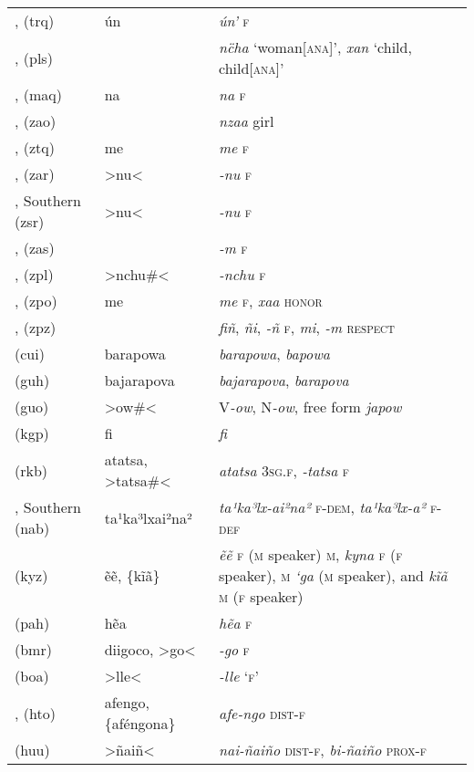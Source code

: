 {\begin{longtable}{L{.25\textwidth}L{.25\textwidth}L{.5\textwidth}}
,  (trq)	&	ún\textquotesingle{}	&	\textit{ún’} \textsc{f}	\\
,  (pls)	&		&	\textit{nc̈ha} ‘woman[\textsc{ana}]’, \textit{xan} ‘child, child[\textsc{ana}]’	\\
,  (maq)	&	na	&	\textit{na} \textsc{f}	\\
,  (zao)	&		&	\textit{nzaa} girl	\\
,  (ztq)	&	me	&	\textit{me} \textsc{f}	\\
,  (zar)	&	>nu<	&	\textit{-nu} \textsc{f}	\\
, Southern  (zsr) 	&	>nu<	&	\textit{-nu} \textsc{f}	\\
,  (zas)	&		&	\textit{-m} \textsc{f}	\\
,  (zpl)	&	>nchu\#<	&	\textit{-nchu} \textsc{f}	\\
,  (zpo)	&	me	&	\textit{me} \textsc{f}, \textit{xaa} \textsc{honor}	\\
,  (zpz)	&		&	\textit{fiñ}, \textit{ñi}, \textit{-ñ} \textsc{f}, \textit{mi}, \textit{-m} \textsc{respect}	\\
 (cui)	&	barapowa	&	\textit{barapowa}, \textit{bapowa}	\\
 (guh)	&	bajarapova	&	\textit{bajarapova}, \textit{barapova}	\\
 (guo)	&	>ow\#<	&	V\textit{-ow}, N\textit{-ow}, free form \textit{japow}	\\
 (kgp)	&	fi	&	\textit{fi}	\\
 (rkb)	&	atatsa, >tatsa\#<	&	\textit{atatsa} \textsc{3sg.f}, \textit{-tatsa} \textsc{f}	\\
, Southern (nab)	&	ta¹ka³lxai²na²	&	\textit{ta¹ka³lx-ai²na²} \textsc{f-dem}, \textit{ta¹ka³lx-a²} \textsc{f-def}	\\
 (kyz)	&	ẽẽ, \{kĩã\}	&	\textit{ẽẽ} \textsc{f} (\textsc{m} speaker) \textsc{m}, \textit{kyna} \textsc{f} (\textsc{f} speaker), \textsc{m} \textit{‘ga} (\textsc{m} speaker), and \textit{kĩã} \textsc{m} (\textsc{f} speaker)	\\
 (pah)	&	hẽa	&	\textit{hẽa} \textsc{f}	\\
 (bmr)	&	diigoco, >go<	&	\textit{-go} \textsc{f}	\\
 (boa)	&	>lle<	&	\textit{-lle} ‘\textsc{f}’	\\
,  (hto)	&	afengo, \{aféngona\}	&	\textit{afe-ngo} \textsc{dist-f}	\\
  (huu)	&	>ñaiñ<	&	\textit{nai-ñaiño} \textsc{dist-f}, \textit{bi-ñaiño} \textsc{prox-f}	\\
\end{longtable}}




